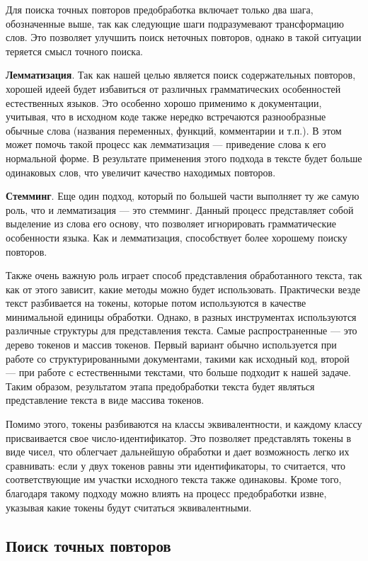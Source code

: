\documentclass[14pt]{matmex-diploma-custom}
\begin{document}
Для поиска точных повторов предобработка включает только два шага, обозначенные выше, так как следующие шаги подразумевают трансформацию слов. Это позволяет улучшить поиск неточных повторов, однако в такой ситуации теряется смысл точного поиска.

\textbf{Лемматизация}. Так как нашей целью является поиск содержательных повторов, хорошей идеей будет избавиться от различных грамматических особенностей естественных языков. Это особенно хорошо применимо к документации, учитывая, что в исходном коде также нередко встречаются разнообразные обычные слова (названия переменных, функций, комментарии и т.п.). В этом может помочь такой процесс как лемматизация --- приведение слова к его нормальной форме. В результате применения этого подхода в тексте будет больше одинаковых слов, что увеличит качество находимых повторов.

\textbf{Стемминг}. Еще один подход, который по большей части выполняет ту же самую роль, что и лемматизация --- это стемминг. Данный процесс представляет собой выделение из слова его основу, что позволяет игнорировать грамматические особенности языка. Как и лемматизация, способствует более хорошему поиску повторов.

Также очень важную роль играет способ представления обработанного текста, так как от этого зависит, какие методы можно будет использовать. Практически везде текст разбивается на токены, которые потом используются в качестве минимальной единицы обработки. Однако, в разных инструментах используются различные структуры для представления текста. Самые распространенные --- это дерево токенов и массив токенов. Первый вариант обычно используется при работе со структурированными документами, такими как исходный код, второй --- при работе с естественными текстами, что больше подходит к нашей задаче. Таким образом, результатом этапа предобработки текста будет являться представление текста в виде массива токенов.

Помимо этого, токены разбиваются на классы эквивалентности, и каждому классу присваивается свое число-идентификатор. Это позволяет представлять токены в виде чисел, что облегчает дальнейшую обработки и дает возможность легко их сравнивать: если у двух токенов равны эти идентификаторы, то считается, что соответствующие им участки исходного текста также одинаковы. Кроме того, благодаря такому подходу можно влиять на процесс предобработки извне, указывая какие токены будут считаться эквивалентными.

\subsection{Поиск точных повторов}
\end{document}
